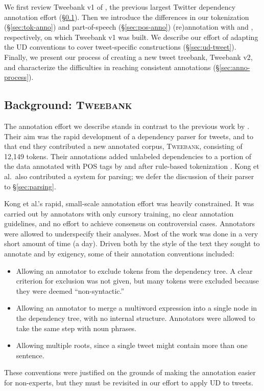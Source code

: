 \documentclass[11pt,a4paper]{article}
\newcommand{\yicomment}[1]{\textcolor{gray}{[#1 ---\textsc{yi}]}}
\begin{document}
We first review {\sc Tweebank v1} of \citet{kong-EtAl:2014:EMNLP2014},
the previous largest Twitter dependency annotation effort 
(\S\ref{sec:tweebank}).
Then we introduce the differences in our tokenization
(\S\ref{sec:tok-anno}) and part-of-speech (\S\ref{sec:pos-anno}) (re)annotation with \citet{ICWSM101540} and 
\citet{gimpel-EtAl:2011:ACL-HLT2011}, respectively, on which {\sc Tweebank v1} was built. 
We describe our effort of adapting the
UD conventions to cover tweet-specific constructions (\S\ref{sec:ud-tweet}). 
Finally, we present our process of creating a new tweet treebank, {\sc
  Tweebank v2}, and characterize
the difficulties in reaching consistent annotations (\S\ref{sec:anno-process}).

\subsection{Background: \textsc{Tweebank}}\label{sec:tweebank}

The annotation effort we describe stands in contrast to the previous work
by .  Their aim was the rapid
development of a dependency parser for tweets, and to that end they
contributed a new annotated corpus, \textsc{Tweebank}, consisting of
12,149 tokens.  Their annotations added unlabeled dependencies to a portion of the data
annotated with POS tags by 
 and
 after rule-based tokenization \citep{ICWSM101540}.
Kong et al.~also contributed a system for parsing;
we defer the discussion of their parser to \S\ref{sec:parsing}.

Kong et al.'s rapid, small-scale annotation effort was heavily constrained.  It was
carried out by annotators with only cursory training, no clear
annotation guidelines, and no effort to achieve consensus on controversial
cases. Annotators were allowed to underspecify their analyses.
Most of the work was done in a very short amount of
time (a day).  Driven both by the style of the text they sought to annotate
and by exigency, some of their annotation conventions included:
\begin{itemize}
\item Allowing an annotator to exclude tokens from the dependency
  tree.  A clear criterion for exclusion was not given, but many
  tokens were excluded because they were deemed ``non-syntactic.''%
\item Allowing an annotator to merge a multiword expression into a
  single node in the dependency tree, with no internal structure.
  Annotators were allowed to take the same step with noun phrases.
\item Allowing multiple roots, since a single tweet might contain more
  than one sentence.
\end{itemize}
These conventions were justified on the grounds of making the
annotation easier for non-experts, but they must be revisited in our
effort to apply UD to tweets.
\end{document}
